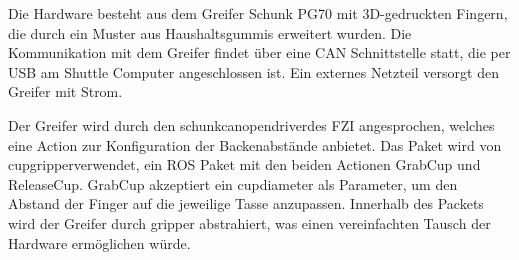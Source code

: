 Die Hardware besteht aus dem Greifer Schunk PG70 mit 3D-gedruckten Fingern, die durch ein Muster aus Haushaltsgummis erweitert wurden. Die Kommunikation mit dem Greifer findet über eine CAN Schnittstelle statt, die per USB am Shuttle Computer angeschlossen ist. Ein externes Netzteil versorgt den Greifer mit Strom.

Der Greifer wird durch den \glqq schunk\textunderscore canopen\textunderscore driver\grqq des FZI angesprochen, welches eine Action zur Konfiguration der Backenabstände anbietet. Das Paket wird von \glqq cup\textunderscore gripper\grqq verwendet, ein ROS Paket mit den beiden Actionen GrabCup und ReleaseCup. GrabCup akzeptiert ein cup\textunderscore diameter als Parameter, um den Abstand der Finger auf die jeweilige Tasse anzupassen. Innerhalb des Packets wird der Greifer durch \glqq gripper \grqq abstrahiert, was einen vereinfachten Tausch der Hardware ermöglichen würde.
